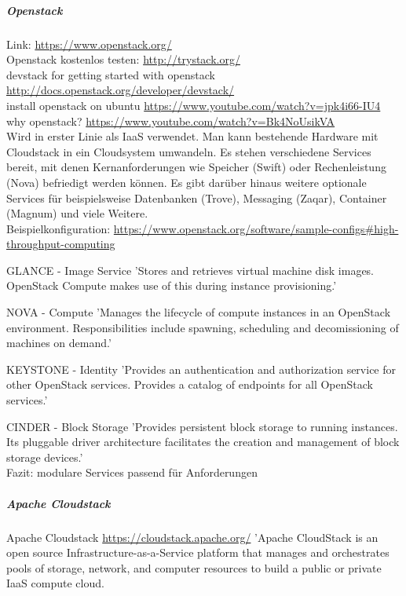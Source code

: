 \documentclass[a4paper,10pt]{article}
\numberwithin{figure}{section}
\numberwithin{table}{section}
\begin{document}
\subparagraph{Openstack}

Link: \url{https://www.openstack.org/}\\
Openstack kostenlos testen: \url{http://trystack.org/}\\
devstack for getting started with openstack \url{http://docs.openstack.org/developer/devstack/}\\
install openstack on ubuntu \url{https://www.youtube.com/watch?v=jpk4i66-IU4}\\

why openstack? \url{https://www.youtube.com/watch?v=Bk4NoUsikVA}\\

Wird in erster Linie als IaaS verwendet.
Man kann bestehende Hardware mit Cloudstack in ein Cloudsystem umwandeln.
Es stehen verschiedene Services bereit, mit denen Kernanforderungen wie Speicher (Swift) oder Rechenleistung (Nova) befriedigt werden können.
Es gibt darüber hinaus weitere optionale Services für beispielsweise Datenbanken (Trove), Messaging (Zaqar), Container (Magnum) und viele Weitere.\\

Beispielkonfiguration: \url{https://www.openstack.org/software/sample-configs#high-throughput-computing}

GLANCE - Image Service
'Stores and retrieves virtual machine disk images. OpenStack Compute makes use of this during instance provisioning.'

NOVA - Compute
'Manages the lifecycle of compute instances in an OpenStack environment. Responsibilities include spawning, scheduling and decomissioning of machines on demand.'

KEYSTONE - Identity
'Provides an authentication and authorization service for other OpenStack services. Provides a catalog of endpoints for all OpenStack services.'

CINDER - Block Storage
'Provides persistent block storage to running instances. Its pluggable driver architecture facilitates the creation and management of block storage devices.'\\

Fazit:
modulare Services
passend für Anforderungen

\subparagraph{Apache Cloudstack}

\begin{my-boxed}{Apache Cloudstack \url{https://cloudstack.apache.org/}}
'Apache CloudStack is an open source Infrastructure-as-a-Service platform that manages and orchestrates pools of storage, network, and computer resources to build a public or private IaaS compute cloud.
\end{my-boxed}
\end{document}
